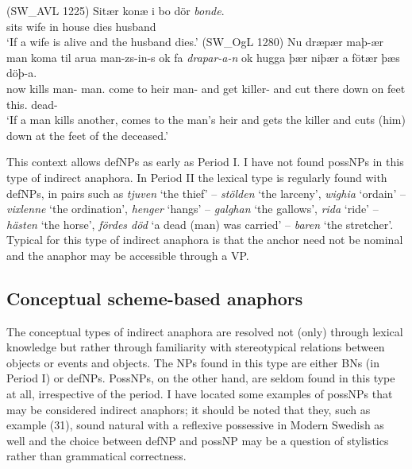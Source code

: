 \documentclass[output=paper]{langsci/langscibook}
\begin{document}
\filbreak
\begin{exe}
\ex\label{6ex:29}
(SW\_AVL 1225)
\exi{}
\gll Sitær konæ i bo dör {\emph{bonde}}. \\
sits wife in house dies husband \\
\glt `If a wife is alive and the husband dies.' 
\ex\label{6ex:30}
(SW\_OgL 1280)
\exi{}
\gll Nu dræpær maþ-ær man koma til arua man-zs-in-s ok fa {\emph{drapar-a-n}} ok hugga þær niþær a fötær þæs döþ-a. \\
now kills man-{} man.{} come to heir man-{} and get killer-{} and cut there down on feet this.{} dead-{} \\
\glt `If a man kills another, comes to the man's heir and gets the killer and cuts (him) down at the feet of the deceased.'
\end{exe}

This context allows defNPs as early as Period I. I have not found possNPs in this type of indirect anaphora. In Period II the lexical type is regularly found with defNPs, in pairs such as {\emph{tjuven}} `the thief' -- {\emph{stölden}} `the larceny', {\emph{wighia}} `ordain' -- {\emph{vixlenne}} `the ordination', {\emph{henger}} `hangs' -- {\emph{galghan}} `the gallows', {\emph{rida}} `ride' -- {\emph{hästen}} `the horse', {\emph{fördes död}} `a dead (man) was carried' -- {\emph{baren}} `the stretcher'. Typical for this type of indirect anaphora is that the anchor need not be nominal and the anaphor may be accessible through a VP.


\subsection{Conceptual scheme-based anaphors}\label{6sec:43}

The conceptual types of indirect anaphora are resolved not (only) through lexical knowledge but rather through familiarity with stereotypical relations between objects or events and objects. The NPs found in this type are either BNs (in Period I) or defNPs. PossNPs, on the other hand, are seldom found in this type at all, irrespective of the period. I have located some examples of possNPs that may be considered indirect anaphors; it should be noted that they, such as example (31), sound natural with a reflexive possessive in Modern Swedish as well and the choice between defNP and possNP may be a question of stylistics rather than grammatical correctness.
\end{document}
